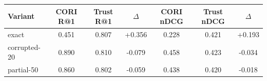 \begin{tabular}{l ccc ccc}
\toprule
Variant & CORI R@1 & Trust R@1 & $\Delta$ & CORI nDCG & Trust nDCG & $\Delta$ \\
\midrule
exact & 0.451 & 0.807 & +0.356 & 0.228 & 0.421 & +0.193 \\
corrupted-20 & 0.890 & 0.810 & -0.079 & 0.458 & 0.423 & -0.034 \\
partial-50 & 0.860 & 0.802 & -0.059 & 0.438 & 0.420 & -0.018 \\
\bottomrule
\end{tabular}
